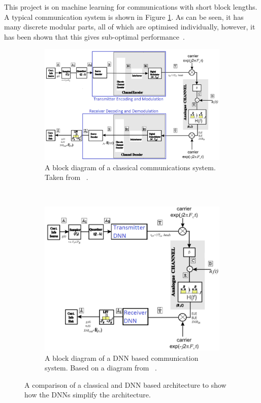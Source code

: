 \documentclass[12pt,onecolumn,letterpaper]{article}
\begin{document}
This project is on machine learning for communications with short block lengths. A typical communication system is shown in Figure \ref{fig:ClassicalCommsBlockDiagram}. As can be seen, it has many discrete modular parts, all of which are optimised individually, however, it has been shown that this gives sub-optimal performance~\cite{ChannelEncodingOptimality}.

\begin{figure}[t!]
   \centering
   \begin{subfigure}[t]{0.45\textwidth}
      \centering
      \includegraphics[width=\linewidth]{figures/classical_comms_block_diagram.png}
      \caption{A block diagram of a classical communications system. Taken from ~\cite{EE3CommsSystemsNotesL4}.}
      \label{fig:ClassicalCommsBlockDiagram}
  \end{subfigure}
  ~
  \begin{subfigure}[t]{0.45\textwidth}
       \centering
       \includegraphics[width=\linewidth]{figures/dnn_block_diagram.png}
       \caption{A block diagram of a DNN based communication system. Based on a diagram from ~\cite{EE3CommsSystemsNotesL4}.}
       \label{fig:DNNCommsBlockDiagram}
   \end{subfigure}
   \caption{A comparison of a classical and DNN based architecture to show how the DNNs simplify the architecture.}
   \label{fig:tSneConstellationDiags}
\end{figure}
\end{document}
